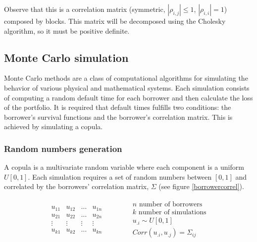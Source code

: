 \documentclass[a4paper,12pt,final]{article}
\begin{document}
Observe that this is a correlation matrix (symmetric, $|\rho_{i,j}| \leq 1$, 
$|\rho_{i,i}| = 1$) composed by blocks. This matrix will be decomposed using 
the Cholesky algorithm, so it must be positive definite.

\subsection{Monte Carlo simulation}
\label{mcsim}
Monte Carlo methods are a class of computational algorithms for 
simulating the behavior of various physical and mathematical systems. 
Each simulation consists of computing a random default time for each borrower and
then calculate the loss of the portfolio. It is required that default times fulfills 
two conditions: the borrower's survival functions and the borrower's correlation matrix. 
This is achieved by simulating a copula. 

\subsubsection{Random numbers generation}
A copula \cite{copu:pitfalls} \cite{copu:wang} is a multivariate random variable 
where each component is a uniform $U[0,1]$. Each simulation requires a set of 
random numbers between $[0, 1]$ and correlated by the borrowers' correlation 
matrix, $\Sigma$ (see figure \ref{borrowercorrel}).

\begin{displaymath}
\begin{array}{ccc}
\begin{array}{|c|c|c|c|}
u_{11} & u_{12} & \dots  & u_{1n} \\
u_{21} & u_{22} & \dots  & u_{2n} \\
\vdots & \vdots & \vdots & \vdots \\
u_{k1} & u_{k2} & \dots  & u_{kn} \\
\end{array}
&
\qquad
&
\begin{array}{c}
n \textrm{ number of borrowers}    \\
k \textrm{ number of simulations}  \\
u_{.i} \sim U[0,1]                 \\
Corr(u_{.i}, u_{.j}) = \Sigma_{ij} \\
\end{array}
\end{array}
\end{displaymath}
\end{document}
